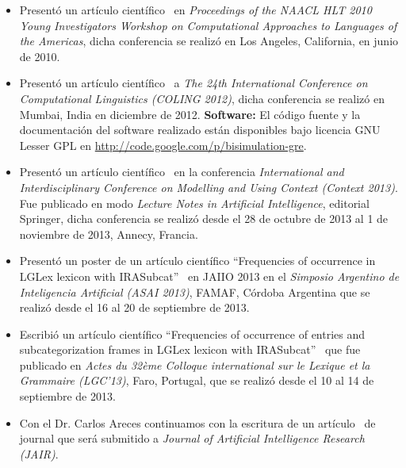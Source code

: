 \begin{itemize}
\item Present\'o un art\'iculo cient\'ifico~\cite{altamirano-alonsoalemany:2010:YOUNG} en \emph{Proceedings of the NAACL HLT 2010 Young Investigators Workshop on Computational
Approaches to Languages of the Americas}, dicha conferencia se realiz\'o en Los Angeles, California, en junio de 2010.
\item Present\'o un art\'iculo cient\'ifico~\cite{altamirano-areces-benotti:2012:POSTERS} a \emph{The 24th International Conference on Computational Linguistics (COLING 2012)}, dicha conferencia se realiz\'o en Mumbai, India en diciembre de 2012. \textbf{Software:} El c\'odigo fuente y la documentaci\'on del software realizado est\'an disponibles bajo licencia GNU Lesser GPL en \url{http://code.google.com/p/bisimulation-gre}.
\item Present\'o un art\'iculo cient\'ifico~\cite{benotti-altamirano-context2013} en la conferencia \emph{International and Interdisciplinary Conference on Modelling and Using Context (Context 2013)}. Fue publicado en modo \emph{Lecture Notes in Artificial Intelligence}, editorial Springer, dicha conferencia se realiz\'o desde el 28 de octubre de 2013 al 1 de noviembre de 2013, Annecy, Francia.
\item Present\'o un poster de un art\'iculo cient\'ifico ``Frequencies of occurrence in LGLex lexicon with IRASubcat''~\cite{tolone-altamirano} en JAIIO 2013 en el \emph{Simposio Argentino de Inteligencia Artificial (ASAI 2013)}, FAMAF, C\'ordoba Argentina que se realiz\'o desde el 16 al 20 de septiembre de 2013.
\item Escribi\'o un art\'iculo cient\'ifico ``Frequencies of occurrence of entries and subcategorization frames in LGLex lexicon with IRASubcat''~\cite{tolonealtamirano2} que fue publicado en \emph{Actes du 32\`eme Colloque international sur le Lexique et la Grammaire (LGC'13)}, Faro, Portugal, que se realiz\'o desde el 10 al 14 de septiembre de 2013.
\item Con el Dr. Carlos Areces continuamos con la escritura de un art\'iculo~\cite{benotti-altamirano-jair} de journal que ser\'a submitido a \emph{Journal of Artificial Intelligence Research (JAIR)}.
\end{itemize}


